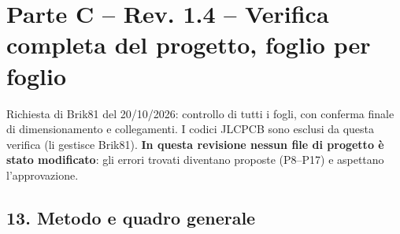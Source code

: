 \clearpage
\section[Parte C – Rev. 1.4 – Verifica completa del progetto, foglio per foglio]{Parte C – Rev. 1.4 – Verifica completa del progetto, foglio per foglio}

Richiesta di Brik81 del 20/\allowbreak{}10/\allowbreak{}2026: controllo di tutti i fogli, con conferma finale di dimensionamento e collegamenti. I codici JLCPCB sono esclusi da questa verifica (li gestisce Brik81). \textbf{In questa revisione nessun file di progetto è stato modificato}: gli errori trovati diventano proposte (P8–P17) e aspettano l'approvazione.

\subsection[13. Metodo e quadro generale]{13. Metodo e quadro generale}

